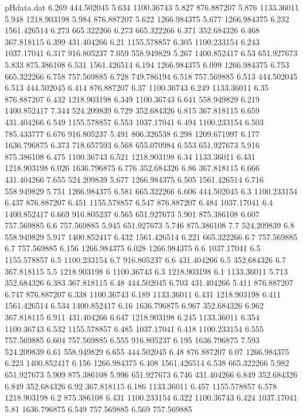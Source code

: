 \begin{filecontents}{pHdata.dat}
6.269	444.502045
5.634	1100.36743
5.827	876.887207
5.876	1133.36011
5.948	1218.903198
5.984	876.887207
5.622	1266.984375
5.677	1266.984375
6.232	1561.426514
6.273	665.322266
6.273	665.322266
6.371	352.684326
6.468	367.818115
6.399	431.404266
6.21	1155.578857
6.305	1100.233154
6.243	1037.17041
6.317	916.805237
7.059	558.949829
5.267	1400.852417
6.53	651.927673
5.833	875.386108
6.531	1561.426514
6.194	1266.984375
6.099	1266.984375
6.753	665.322266
6.758	757.569885
6.728	749.786194
6.518	757.569885
6.513	444.502045
6.513	444.502045
6.414	876.887207
6.37	1100.36743
6.249	1133.36011
6.35	876.887207
6.432	1218.903198
6.349	1100.36743
6.641	558.949829
6.219	1400.852417
7.344	524.209839
6.729	352.684326
6.815	367.818115
6.659	431.404266
6.549	1155.578857
6.553	1037.17041
6.494	1100.233154
6.503	785.433777
6.676	916.805237
5.491	806.326538
6.298	1209.671997
6.177	1636.796875
6.373	718.657593
6.568	655.070984
6.553	651.927673
5.916	875.386108
6.475	1100.36743
6.521	1218.903198
6.34	1133.36011
6.431	1218.903198
6.026	1636.796875
6.776	352.684326
6.86	367.818115
6.666	431.404266
7.655	524.209839
5.677	1266.984375
6.505	1561.426514
6.716	558.949829
5.751	1266.984375
6.581	665.322266
6.606	444.502045
6.3	1100.233154
6.437	876.887207
6.451	1155.578857
6.547	876.887207
6.484	1037.17041
6.4	1400.852417
6.669	916.805237
6.565	651.927673
5.901	875.386108
6.607	757.569885
6.6	757.569885
5.945	651.927673
5.746	875.386108
7.7	524.209839
6.8	558.949829
5.917	1400.852417
6.432	1561.426514
6.221	665.322266
6.7	757.569885
6.7	757.569885
6.156	1266.984375
6.028	1266.984375
6.6	1037.17041
6.5	1155.578857
6.5	1100.233154
6.7	916.805237
6.6	431.404266
6.5	352.684326
6.7	367.818115
5.5	1218.903198
6	1100.36743
6.3	1218.903198
6.1	1133.36011
5.713	352.684326
6.383	367.818115
6.48	444.502045
6.703	431.404266
5.411	876.887207
6.747	876.887207
6.338	1100.36743
6.189	1133.36011
6.431	1218.903198
6.411	1561.426514
6.534	1400.852417
6.16	1636.796875
6.967	352.684326
6.962	367.818115
6.911	431.404266
6.647	1218.903198
6.245	1133.36011
6.354	1100.36743
6.532	1155.578857
6.485	1037.17041
6.418	1100.233154
6.555	757.569885
6.604	757.569885
6.555	916.805237
6.195	1636.796875
7.593	524.209839
6.61	558.949829
6.655	444.502045
6.48	876.887207
6.07	1266.984375
6.223	1400.852417
6.156	1266.984375
6.408	1561.426514
6.538	665.322266
5.982	651.927673
5.909	875.386108
5.996	651.927673
6.746	431.404266
6.849	352.684326
6.849	352.684326
6.92	367.818115
6.186	1133.36011
6.457	1155.578857
6.578	1218.903198
6.2	875.386108
6.431	1100.233154
6.322	1100.36743
6.424	1037.17041
5.81	1636.796875
6.549	757.569885
6.569	757.569885

\end{filecontents}
